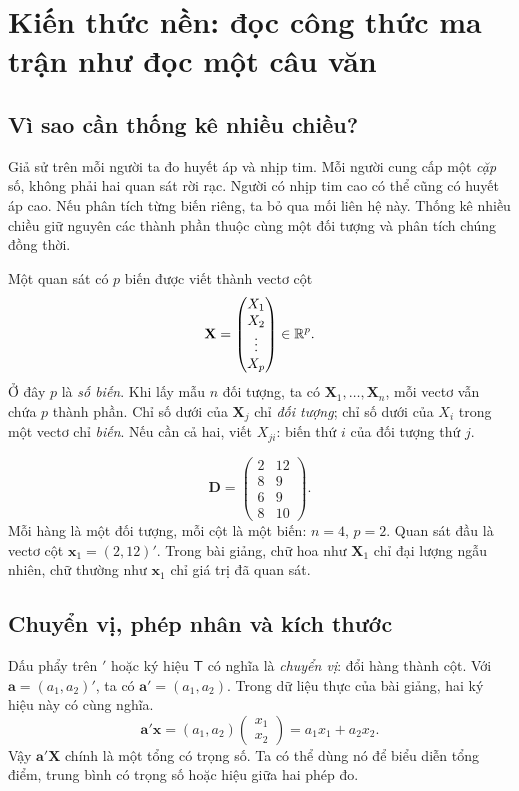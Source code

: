 \clearpage
\section{Kiến thức nền: đọc công thức ma trận như đọc một câu văn}
\label{sec:foundations}

\subsection{Vì sao cần thống kê nhiều chiều?}
Giả sử trên mỗi người ta đo huyết áp và nhịp tim. Mỗi người cung cấp một
\emph{cặp} số, không phải hai quan sát rời rạc. Người có nhịp tim cao có thể
cũng có huyết áp cao. Nếu phân tích từng biến riêng, ta bỏ qua mối liên hệ này.
Thống kê nhiều chiều giữ nguyên các thành phần thuộc cùng một đối tượng và
phân tích chúng đồng thời.

Một quan sát có $p$ biến được viết thành vectơ cột
\[
 \mathbf X=\begin{pmatrix}X_1\\X_2\\\vdots\\X_p\end{pmatrix}\in\mathbb R^p.
\]
Ở đây $p$ là \emph{số biến}. Khi lấy mẫu $n$ đối tượng, ta có
$\mathbf X_1,\ldots,\mathbf X_n$, mỗi vectơ vẫn chứa $p$ thành phần.
Chỉ số dưới của $\mathbf X_j$ chỉ \emph{đối tượng}; chỉ số dưới của $X_i$ trong
một vectơ chỉ \emph{biến}. Nếu cần cả hai, viết $X_{ji}$: biến thứ $i$ của đối
tượng thứ $j$.

\begin{example}
\[
 \mathbf D=\begin{pmatrix}2&12\\8&9\\6&9\\8&10\end{pmatrix}.
\]
Mỗi hàng là một đối tượng, mỗi cột là một biến: $n=4$, $p=2$.
Quan sát đầu là vectơ cột $\mathbf x_1=(2,12)'$.
Trong bài giảng, chữ hoa như $\mathbf X_1$ chỉ đại lượng ngẫu nhiên,
chữ thường như $\mathbf x_1$ chỉ giá trị đã quan sát.
\end{example}


\subsection{Chuyển vị, phép nhân và kích thước}
Dấu phẩy trên $'$ hoặc ký hiệu $\mathsf T$ có nghĩa là \emph{chuyển vị}:
đổi hàng thành cột. Với $\mathbf a=(a_1,a_2)'$, ta có
$\mathbf a'=(a_1,a_2)$. Trong dữ liệu thực của bài giảng, hai ký hiệu này
có cùng nghĩa.
\[
 \mathbf a'\mathbf x=(a_1,a_2)
 \begin{pmatrix}x_1\\x_2\end{pmatrix}=a_1x_1+a_2x_2.
\]
Vậy $\mathbf a'\mathbf X$ chính là một tổng có trọng số. Ta có thể dùng nó
để biểu diễn tổng điểm, trung bình có trọng số hoặc hiệu giữa hai phép đo.

